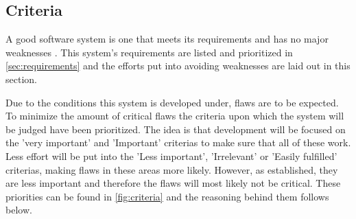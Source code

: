 \subsection{Criteria}\label{sec:architecturecriteria}
A good software system is one that meets its requirements and has no major weaknesses \citep[p.~179]{Rod-Aalborg}.
This system's requirements are listed and prioritized in \cref{sec:requirements} and the efforts put into avoiding weaknesses are laid out in this section.

Due to the conditions this system is developed under, flaws are to be expected.
To minimize the amount of critical flaws the criteria \citep[p.~180]{Rod-Aalborg} upon which the system will be judged have been prioritized.
The idea is that development will be focused on the 'very important' and 'Important' criterias to make sure that all of these work.
Less effort will be put into the 'Less important', 'Irrelevant' or 'Easily fulfilled' criterias, making flaws in these areas more likely.
However, as established, they are less important and therefore the flaws will most likely not be critical.
These priorities can be found in \cref{fig:criteria} and the reasoning behind them follows below.



